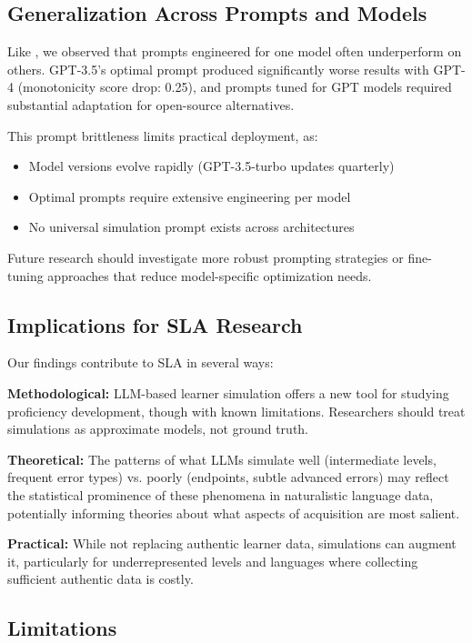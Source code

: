 \subsection{Generalization Across Prompts and Models}

Like \citet{benedetto2024using}, we observed that prompts engineered for one model often underperform on others. GPT-3.5's optimal prompt produced significantly worse results with GPT-4 (monotonicity score drop: 0.25), and prompts tuned for GPT models required substantial adaptation for open-source alternatives.

This prompt brittleness limits practical deployment, as:
\begin{itemize}
    \item Model versions evolve rapidly (GPT-3.5-turbo updates quarterly)
    \item Optimal prompts require extensive engineering per model
    \item No universal simulation prompt exists across architectures
\end{itemize}

Future research should investigate more robust prompting strategies or fine-tuning approaches that reduce model-specific optimization needs.

\subsection{Implications for SLA Research}

Our findings contribute to SLA in several ways:

\textbf{Methodological:} LLM-based learner simulation offers a new tool for studying proficiency development, though with known limitations. Researchers should treat simulations as approximate models, not ground truth.

\textbf{Theoretical:} The patterns of what LLMs simulate well (intermediate levels, frequent error types) vs. poorly (endpoints, subtle advanced errors) may reflect the statistical prominence of these phenomena in naturalistic language data, potentially informing theories about what aspects of acquisition are most salient.

\textbf{Practical:} While not replacing authentic learner data, simulations can augment it, particularly for underrepresented levels and languages where collecting sufficient authentic data is costly.

\subsection{Limitations}

